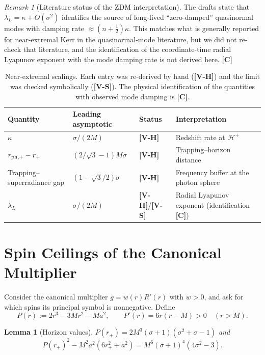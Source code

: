 \documentclass[11pt, a4paper]{article}
\newcommand{\VS}{\textcolor{vs}{\textbf{[V-S]}}}
\newcommand{\VH}{\textcolor{vh}{\textbf{[V-H]}}}
\newcommand{\CC}{\textcolor{cc}{\textbf{[C]}}}
\newtheorem{lemma}[theorem]{Lemma}
\theoremstyle{remark}
\newtheorem{remark}[theorem]{Remark}
\theoremstyle{definition}
\begin{document}
\begin{remark}[Literature status of the ZDM interpretation]
The drafts state that $\lambda_L = \kappa + O(\sigma^2)$ identifies the source of long-lived ``zero-damped'' quasinormal modes with damping rate $\approx(n+\tfrac12)\kappa$. This matches what is generally reported for near-extremal Kerr in the quasinormal-mode literature, but we did not re-check that literature, and the identification of the coordinate-time radial Lyapunov exponent with the mode damping rate is not derived here. \CC
\end{remark}

\begin{table}[H]
\centering
\caption{Near-extremal scalings. Each entry was re-derived by hand (\VH) and the limit was checked symbolically (\VS). The physical identification of the quantities with observed mode damping is \CC.}
\label{tab:triple}
\footnotesize\begin{tabular}{@{}llll@{}}
\toprule
Quantity & Leading asymptotic & Status & Interpretation \\
\midrule
$\kappa$ & $\sigma/(2M)$ & \VH & Redshift rate at $\mathcal{H}^+$ \\
$r_{{\rm ph},+} - r_+$ & $(2/\sqrt3-1)M\sigma$ & \VH & Trapping--horizon distance \\
Trapping--superradiance gap & $(1-\sqrt3/2)\sigma$ & \VH & Frequency buffer at the photon sphere \\
$\lambda_L$ & $\sigma/(2M)$ & \VH/\VS & Radial Lyapunov exponent (identification \CC) \\
\bottomrule
\end{tabular}
\end{table}

\section{Spin Ceilings of the Canonical Multiplier}
\label{sec:ceilings}

Consider the canonical multiplier $g = w(r)R'(r)$ with $w>0$, and ask for which spins its principal symbol is nonnegative. Define
\[
P(r) := 2r^3 - 3Mr^2 - Ma^2, \qquad P'(r) = 6r(r-M) > 0 \quad (r>M).
\]

\begin{lemma}[Horizon values]
\label{lem:Prp}
$P(r_+) = 2M^3(\sigma+1)(\sigma^2+\sigma-1)$ and
\[
P(r_+)^2 - M^2a^2(6r_+^2 + a^2) = M^6(\sigma+1)^4(4\sigma^2 - 3).
\]
\end{lemma}
\end{document}
